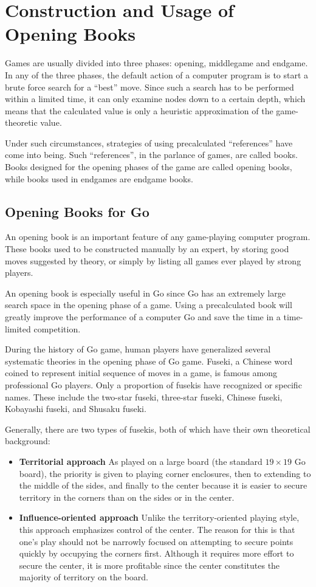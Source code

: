 \section{Construction and Usage of Opening Books}

Games are usually divided into three phases: opening, middlegame and endgame. In any of the three phases, the default action of a computer program is to start a brute force search for a ``best'' move. Since such a search has to be performed within a limited time, it can only examine nodes down to a certain depth, which means that the calculated value is only a heuristic approximation of the game-theoretic value\cite{lincke2002openbook}.

Under such circumstances, strategies of using precalculated ``references'' have come into being. Such ``references'', in the parlance of games, are called books. Books designed for the opening phases of the game are called opening books, while books used in endgames are endgame books.


\subsection{Opening Books for Go}

An opening book is an important feature of any game-playing computer program. These books used to be constructed manually by an expert, by storing good moves suggested by theory, or simply by listing all games ever played by
strong players.

An opening book is especially useful in Go since Go has an extremely large search space in the opening phase of a game. Using a precalculated book will greatly improve the performance of a computer Go and save the time in a time-limited competition.

During the history of Go game, human players have generalized several systematic theories in the opening phase of Go game. Fuseki, a Chinese word coined to represent initial sequence of moves in a game, is famous among professional Go players. Only a proportion of fusekis have recognized or specific names. These include the two-star fuseki, three-star fuseki, Chinese fuseki, Kobayashi fuseki, and Shusaku fuseki.

Generally, there are two types of fusekis, both of which have their own theoretical background:
\begin{itemize}
\item \textbf{Territorial approach}
As played on a large board (the standard $19 \times 19$ Go board), the priority is given to playing corner enclosures, then to extending to the middle of the sides, and finally to the center because it is easier to secure territory in the corners than on the sides or in the center.
\item \textbf{Influence-oriented approach}
Unlike the territory-oriented playing style, this approach emphasizes control of the center. The reason for this is that one's play should not be narrowly focused on attempting to secure points quickly by occupying the corners first. Although it requires more effort to secure the center, it is more profitable since the center constitutes the majority of territory on the board.
\end{itemize}

